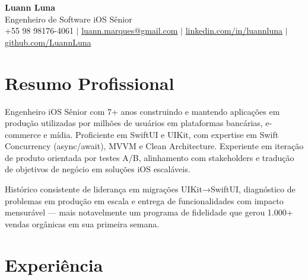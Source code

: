 \documentclass[11pt,letterpaper]{article}
\begin{document}
\begin{center}
    {\LARGE \textbf{Luann Luna}} \\
    \vspace{0.5em}
    Engenheiro de Software iOS Sênior \\
    \vspace{0.3em}
    +55 98 98176-4061 $|$
    \href{mailto:luann.marques@gmail.com}{luann.marques@gmail.com} $|$
    \href{https://linkedin.com/in/luannluna}{linkedin.com/in/luannluna} $|$
    \href{https://github.com/LuannLuna}{github.com/LuannLuna}
\end{center}

\vspace{0.5em}

\section*{Resumo Profissional}
Engenheiro iOS Sênior com 7+ anos construindo e mantendo aplicações em produção utilizadas por milhões de usuários em plataformas bancárias, e-commerce e mídia. Proficiente em SwiftUI e UIKit, com expertise em Swift Concurrency (async/await), MVVM e Clean Architecture. Experiente em iteração de produto orientada por testes A/B, alinhamento com stakeholders e tradução de objetivos de negócio em soluções iOS escaláveis.

Histórico consistente de liderança em migrações UIKit→SwiftUI, diagnóstico de problemas em produção em escala e entrega de funcionalidades com impacto mensurável — mais notavelmente um programa de fidelidade que gerou 1.000+ vendas orgânicas em sua primeira semana.

\section*{Experiência}
\end{document}
